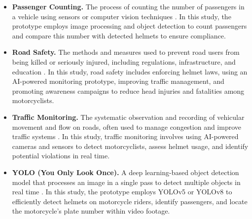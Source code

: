 \begin{refsection}
\begin{itemize}
    \item \textbf{Passenger Counting.} The process of counting the number of passengers in a vehicle using sensors or computer vision techniques \cite{Kim2022}. In this study, the prototype employs image processing and object detection to count passengers and compare this number with detected helmets to ensure compliance.

    \item \textbf{Road Safety.} The methods and measures used to prevent road users from being killed or seriously injured, including regulations, infrastructure, and education \cite{OxfordRef}. In this study, road safety includes enforcing helmet laws, using an AI-powered monitoring prototype, improving traffic management, and promoting awareness campaigns to reduce head injuries and fatalities among motorcyclists.

    \item \textbf{Traffic Monitoring.} The systematic observation and recording of vehicular movement and flow on roads, often used to manage congestion and improve traffic systems \cite{BritannicaTraffic}. In this study, traffic monitoring involves using AI-powered cameras and sensors to detect motorcyclists, assess helmet usage, and identify potential violations in real time.

    \item \textbf{YOLO (You Only Look Once).} A deep learning-based object detection model that processes an image in a single pass to detect multiple objects in real time \cite{Redmon2020}. In this study, the prototype employs YOLOv5 or YOLOv8 to efficiently detect helmets on motorcycle riders, identify passengers, and locate the motorcycle’s plate number within video footage.
\end{itemize}


\clearpage
\printbibliography[heading=subbibintoc, title={\texorpdfstring{\centering}{} Notes}]
\end{refsection}